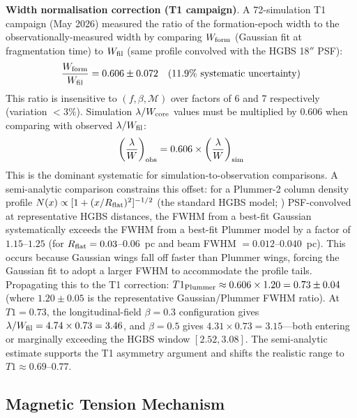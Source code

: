 \documentclass[twoside,twocolumn]{mnras}
\begin{document}
\textbf{Width normalisation correction (T1 campaign)}.
\label{sec:width_correction}
A 72-simulation T1 campaign (May 2026) measured the ratio of the formation-epoch width
to the observationally-measured width by comparing $W_{\rm form}$ (Gaussian fit at
fragmentation time) to $W_{\rm fil}$ (same profile convolved with the HGBS 18$''$ PSF):
\begin{equation}
\frac{W_{\rm form}}{W_{\rm fil}} = 0.606 \pm 0.072 \quad (11.9\% \text{ systematic uncertainty})
\label{eq:t1_correction}
\end{equation}
This ratio is insensitive to $(f, \beta, \mathcal{M})$ over factors of 6 and 7
respectively (variation $<3\%$). Simulation $\lambda/W_{\rm core}$ values must be
multiplied by 0.606 when comparing with observed $\lambda/W_{\rm fil}$:
\begin{equation}
\left(\frac{\lambda}{W}\right)_{\rm obs} = 0.606 \times \left(\frac{\lambda}{W}\right)_{\rm sim}
\label{eq:t1_apply}
\end{equation}
This is the dominant systematic for simulation-to-observation comparisons. A semi-analytic comparison constrains this offset: for a Plummer-2 column density profile $N(x) \propto [1 + (x/R_{\rm flat})^2]^{-1/2}$ (the standard HGBS model; \citealt{Arzoumanian2011}) PSF-convolved at representative HGBS distances, the FWHM from a best-fit Gaussian systematically exceeds the FWHM from a best-fit Plummer model by a factor of $1.15$--$1.25$ (for $R_{\rm flat} = 0.03$--$0.06$~pc and beam FWHM $= 0.012$--$0.040$~pc). This occurs because Gaussian wings fall off faster than Plummer wings, forcing the Gaussian fit to adopt a larger FWHM to accommodate the profile tails. Propagating this to the T1 correction: $T1_{\rm Plummer} \approx 0.606 \times 1.20 = 0.73 \pm 0.04$ (where $1.20 \pm 0.05$ is the representative Gaussian/Plummer FWHM ratio). At $T1 = 0.73$, the longitudinal-field $\beta = 0.3$ configuration gives $\lambda/W_{\rm fil} = 4.74 \times 0.73 = 3.46$, and $\beta = 0.5$ gives $4.31 \times 0.73 = 3.15$---both entering or marginally exceeding the HGBS window $[2.52, 3.08]$. The semi-analytic estimate supports the T1 asymmetry argument and shifts the realistic range to $T1 \approx 0.69$--$0.77$.

\subsection{Magnetic Tension Mechanism}
\end{document}
